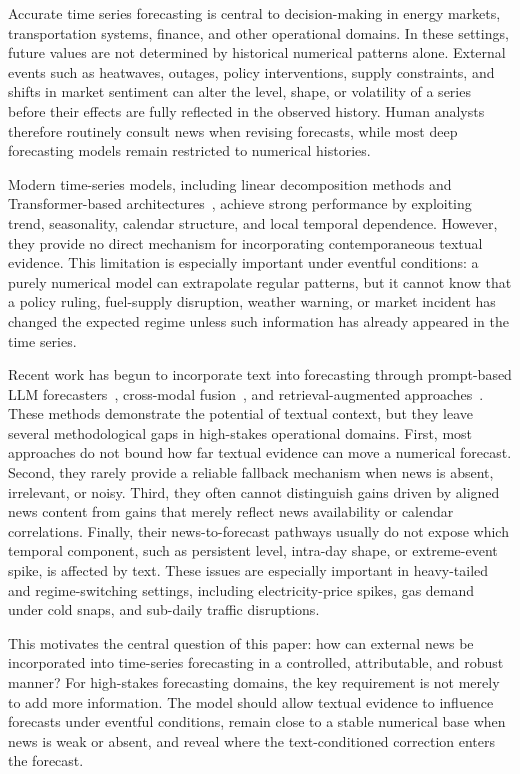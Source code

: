 \documentclass{article}
\begin{document}
Accurate time series forecasting is central to decision-making in energy markets, transportation systems, finance, and other operational domains. In these settings, future values are not determined by historical numerical patterns alone. External events such as heatwaves, outages, policy interventions, supply constraints, and shifts in market sentiment can alter the level, shape, or volatility of a series before their effects are fully reflected in the observed history. Human analysts therefore routinely consult news when revising forecasts, while most deep forecasting models remain restricted to numerical histories.

Modern time-series models, including linear decomposition methods and Transformer-based architectures~\citep{dlinear_zeng2023, patchtst_nie2023, informer_zhou2021}, achieve strong performance by exploiting trend, seasonality, calendar structure, and local temporal dependence. However, they provide no direct mechanism for incorporating contemporaneous textual evidence. This limitation is especially important under eventful conditions: a purely numerical model can extrapolate regular patterns, but it cannot know that a policy ruling, fuel-supply disruption, weather warning, or market incident has changed the expected regime unless such information has already appeared in the time series.

Recent work has begun to incorporate text into forecasting through prompt-based LLM forecasters~\citep{llmtime_gruver2024, timellm_jin2024}, cross-modal fusion~\citep{crossformer_zhang2023}, and retrieval-augmented approaches~\citep{rag_ts_2024}.
These methods demonstrate the potential of textual context, but they leave several methodological gaps in high-stakes operational domains.
First, most approaches do not bound how far textual evidence can move a numerical forecast.
Second, they rarely provide a reliable fallback mechanism when news is absent, irrelevant, or noisy.
Third, they often cannot distinguish gains driven by aligned news content from gains that merely reflect news availability or calendar correlations.
Finally, their news-to-forecast pathways usually do not expose which temporal component, such as persistent level, intra-day shape, or extreme-event spike, is affected by text.
These issues are especially important in heavy-tailed and regime-switching settings, including electricity-price spikes, gas demand under cold snaps, and sub-daily traffic disruptions.

This motivates the central question of this paper: how can external news be incorporated into time-series forecasting in a controlled, attributable, and robust manner? For high-stakes forecasting domains, the key requirement is not merely to add more information. The model should allow textual evidence to influence forecasts under eventful conditions, remain close to a stable numerical base when news is weak or absent, and reveal where the text-conditioned correction enters the forecast.
\end{document}

